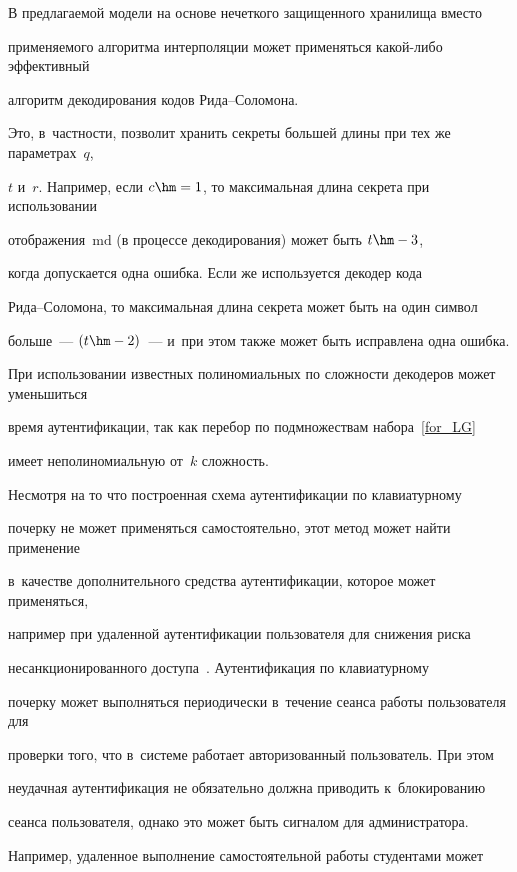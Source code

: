 В предлагаемой модели на основе нечеткого защищенного хранилища вместо 


применяемого алгоритма интерполяции может применяться ка\-кой-ли\-бо эффективный 


алгоритм декодирования кодов  Ри\-да--Со\-ло\-мо\-на. 


Это, в~частности, позволит хранить секреты большей длины при тех же параметрах~$q$, 


$t$ и~$r$. Например, если $c\hm=1$, то максимальная длина секрета при использовании 


отображения~$\mathrm{md}$ (в процессе декодирования) может быть $t\hm-3$, 


когда допускается одна ошибка. Если же используется декодер кода 


Ри\-да--Со\-ло\-мо\-на, то максимальная длина секрета может быть на один символ 


больше~--- $(t\hm-2)$~--- и~при этом также может быть исправлена одна ошибка. 


При использовании известных полиномиальных по сложности декодеров может уменьшиться 


время аутентификации, так как перебор по подмножествам набора~\eqref{for_LG} 


имеет неполиномиальную от~$k$ слож\-ность.





Несмотря на то что построенная схема аутентификации по клавиатурному 


почерку не может применяться самостоятельно, этот метод может найти применение 


в~качестве дополнительного средства аутентификации, которое может применяться, 


например при удаленной аутентификации пользователя для снижения риска 


несанкционированного доступа~\cite{Gra2017}. Аутентификация по клавиатурному 


почерку может выполняться периодически в~течение сеанса работы пользователя для 


проверки того, что в~системе работает авторизованный пользователь. При этом 


неудачная аутентификация не обязательно должна приводить к~блокированию 


сеанса пользователя, однако это может быть сигналом для администратора. 


Например, удаленное выполнение самостоятельной работы студентами может 


